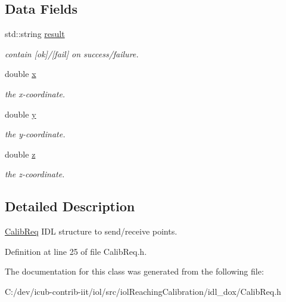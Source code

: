 \subsection*{Data Fields}
\begin{DoxyCompactItemize}
\item 
\mbox{\label{classCalibReq_a02f03036d32f28fad1c1e533a139e75f}} 
std\+::string \mbox{\hyperlink{classCalibReq_a02f03036d32f28fad1c1e533a139e75f}{result}}
\begin{DoxyCompactList}\small\item\em contain \mbox{[}ok\mbox{]}/\mbox{[}fail\mbox{]} on success/failure. \end{DoxyCompactList}\item 
\mbox{\label{classCalibReq_ac264bcfec43ddba85a4570920ec74ba0}} 
double \mbox{\hyperlink{classCalibReq_ac264bcfec43ddba85a4570920ec74ba0}{x}}
\begin{DoxyCompactList}\small\item\em the x-\/coordinate. \end{DoxyCompactList}\item 
\mbox{\label{classCalibReq_a5f335f445b573d868c1f2b900b029db4}} 
double \mbox{\hyperlink{classCalibReq_a5f335f445b573d868c1f2b900b029db4}{y}}
\begin{DoxyCompactList}\small\item\em the y-\/coordinate. \end{DoxyCompactList}\item 
\mbox{\label{classCalibReq_afe51cdf867f132c03e84ff5eec91a4d3}} 
double \mbox{\hyperlink{classCalibReq_afe51cdf867f132c03e84ff5eec91a4d3}{z}}
\begin{DoxyCompactList}\small\item\em the z-\/coordinate. \end{DoxyCompactList}\end{DoxyCompactItemize}


\subsection{Detailed Description}
\mbox{\hyperlink{classCalibReq}{Calib\+Req}} I\+DL structure to send/receive points. 

Definition at line 25 of file Calib\+Req.\+h.



The documentation for this class was generated from the following file\+:\begin{DoxyCompactItemize}
\item 
C\+:/dev/icub-\/contrib-\/iit/iol/src/iol\+Reaching\+Calibration/idl\+\_\+dox/Calib\+Req.\+h\end{DoxyCompactItemize}
